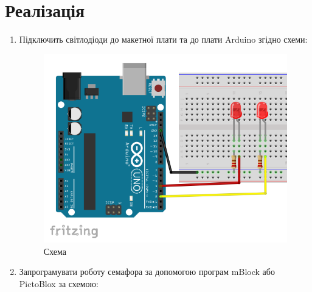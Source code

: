 \documentclass[oneside, final]{article}
\begin{document}
\section{Реалізація}
	\begin{enumerate}
		\item Підключить світлодіоди до макетної плати та до плати Arduino згідно схеми:
			\begin{figure}[!h]
				\centering
				\includegraphics[scale=0.5]{circuit.png}
				\caption{Схема}
			\end{figure}
		\item Запрограмувати роботу семафора за допомогою програм mBlock або PictoBlox за схемою:
		\begin{table}
			\begin{tabular}{|c|c|}
			
			\end{tabular}
		\end{table}
	\end{enumerate}
	
\end{document}
